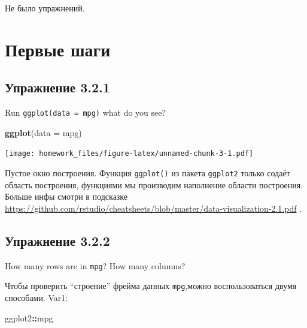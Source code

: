 \documentclass[]{book}
\newenvironment{Shaded}{\begin{snugshade}}{\end{snugshade}}
\newcommand{\KeywordTok}[1]{\textcolor[rgb]{0.13,0.29,0.53}{\textbf{#1}}}
\newcommand{\DataTypeTok}[1]{\textcolor[rgb]{0.13,0.29,0.53}{#1}}
\newcommand{\OperatorTok}[1]{\textcolor[rgb]{0.81,0.36,0.00}{\textbf{#1}}}
\newcommand{\NormalTok}[1]{#1}
\begin{document}
Не было упражнений.

\section{Первые шаги}\label{-}

\subsection*{Упражнение 3.2.1}\label{-3.2.1}

Run \texttt{ggplot(data\ =\ mpg)} what do you see?

\begin{Shaded}
\begin{Highlighting}[]
\KeywordTok{ggplot}\NormalTok{(}\DataTypeTok{data =}\NormalTok{ mpg)}
\end{Highlighting}
\end{Shaded}

\texttt{[image: homework\_files/figure-latex/unnamed-chunk-3-1.pdf]}

Пустое окно построения. Функция \texttt{ggplot()} из пакета
\texttt{ggplot2} только содаёт область построения, функциями мы
производим наполнение области построения. Больше инфы смотри в подсказке
\url{https://github.com/rstudio/cheatsheets/blob/master/data-visualization-2.1.pdf}
.

\subsection*{Упражнение 3.2.2}\label{-3.2.2}

How many rows are in \texttt{mpg}? How many columns?

Чтобы проверить ``строение'' фрейма данных \texttt{mpg},можно
воспользоваться двумя способами. Var1:

\begin{Shaded}
\begin{Highlighting}[]
\NormalTok{ggplot2}\OperatorTok{::}\NormalTok{mpg}
\end{Highlighting}
\end{Shaded}
\end{document}
